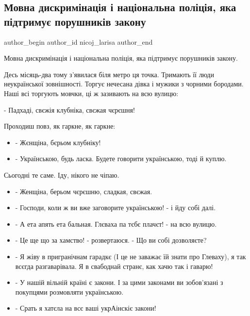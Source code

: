  
 
 
 
 
 
\subsection{Мовна дискримінація і національна поліція, яка підтримує порушників закону}
\label{sec:30_06_2021.fb.nicoj_larisa.1.mova_diskriminacia_policia}
\ifcmt
 author_begin
   author_id nicoj_larisa
 author_end
\fi

Мовна дискримінація і національна поліція, яка підтримує порушників закону.

Десь місяць-два тому з'явилася біля метро ця точка. Тримають її люди неукраїнської зовнішності. Торгує нечесана дівка і мужики з чорними бородами. Наші всі торгують мовчки, ці ж зазивають на всю вулицю:

- Падхаді, свєжія клубніка, свєжая чєрєшня! 

Проходиш повз, як гаркне, як гаркне: 

\begin{itemize}
  \item - Жєнщіна, бєрьом клубніку!
  \item - Українською, будь ласка. Будете говорити українською, тоді й куплю. 
\end{itemize}

Сьогодні те саме. Іду, нікого не чіпаю.

\begin{itemize}
  \item - Женщіна, берьом чєрєшню, сладкая, свєжая.
  \item - Господи, коли ж ви вже заговорите українською! - і йду собі далі.
  \item - А ета апять ета бальная. Глєваха па тєбє плачєт! - на всю вулицю.
  \item - Це ще що за хамство! - розвертаюся. - Що ви собі дозволяєте? 
  \item - Я жіву в пригранічнам гарадкє (І це не заважає їй знати про Глеваху), я так всєгда разгаварівала. Я в свабоднай странє, как хачю так і гаварю!
  \item - У нашій вільній країні є закони. І за цими законами ви зобов'язані з покупцями розмовляти українською.
  \item - Срать я хатєла на всє ваші укрАінскіє закони!
\end{itemize}

